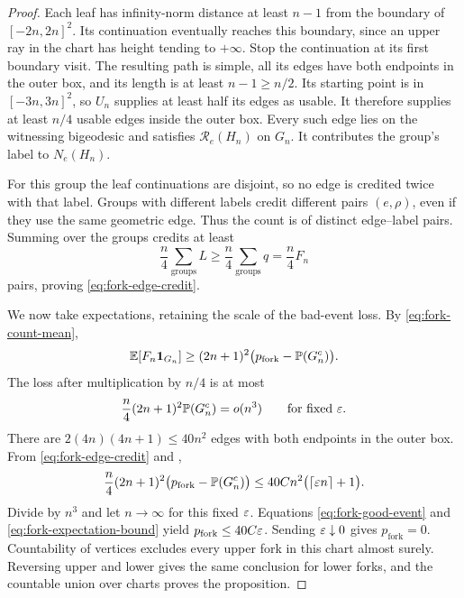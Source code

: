 \begin{proof}
Each leaf has infinity-norm distance at least $n-1$ from the boundary of
$[-2n,2n]^2$.  Its continuation eventually reaches this boundary, since
an upper ray in the chart has height tending to $+\infty$.  Stop the
continuation at its first boundary visit.  The resulting path is simple,
all its edges have both endpoints in the outer box, and its length is at
least $n-1\ge n/2$.  Its starting point is in $[-3n,3n]^2$, so $U_n$
supplies at least half its edges as usable.  It therefore supplies at
least $n/4$ usable edges inside the outer box.  Every such edge lies on
the witnessing bigeodesic and satisfies $\mathcal R_e(H_n)$ on $G_n$.
It contributes the group's label to $N_e(H_n)$.

For this group the leaf continuations are disjoint, so no edge is
credited twice with that label.  Groups with different labels credit
different pairs $(e,\rho)$, even if they use the same geometric edge.
Thus the count is of distinct edge--label pairs.  Summing over the groups
credits at least
\[
 \frac n4\sum_{\text{groups}}L
 \ge\frac n4\sum_{\text{groups}}q
 =\frac n4 F_n
\]
pairs, proving \eqref{eq:fork-edge-credit}.

We now take expectations, retaining the scale of the bad-event loss.
By \eqref{eq:fork-count-mean},
\[
 \mathbb E[F_n\mathbf 1_{G_n}]
 \ge (2n+1)^2
       \bigl(p_{\mathrm{fork}}-\mathbb P(G_n^c)\bigr).
\]
The loss after multiplication by $n/4$ is at most
\begin{equation}\label{eq:fork-bad-event-loss}
 \frac n4(2n+1)^2\mathbb P(G_n^c)=o(n^3)
 \qquad\text{for fixed }\varepsilon.
\end{equation}
There are $2(4n)(4n+1)\le40n^2$ edges with both endpoints in the outer
box.  From \eqref{eq:fork-edge-credit} and ,
\begin{equation}\label{eq:fork-expectation-bound}
 \frac n4(2n+1)^2
       \bigl(p_{\mathrm{fork}}-\mathbb P(G_n^c)\bigr)
 \le 40C n^2\bigl(\lceil\varepsilon n\rceil+1\bigr).
\end{equation}
Divide by $n^3$ and let $n\to\infty$ for this fixed $\varepsilon$.  Equations
\eqref{eq:fork-good-event} and \eqref{eq:fork-expectation-bound} yield
$p_{\mathrm{fork}}\le40C\varepsilon$.  Sending $\varepsilon\downarrow0$ gives
$p_{\mathrm{fork}}=0$.  Countability of vertices excludes every upper
fork in this chart almost surely.  Reversing upper and lower gives the
same conclusion for lower forks, and the countable union over charts
proves the proposition.
\end{proof}


